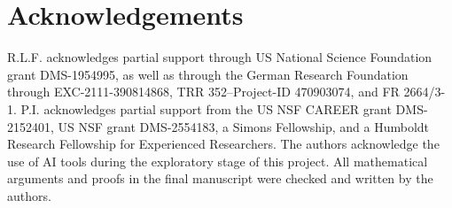 \documentclass[11pt,reqno]{amsart}
\numberwithin{equation}{section}
\begin{document}


\section*{Acknowledgements}
R.L.F. acknowledges partial support through US National Science Foundation grant DMS-1954995, as well as through the German Research Foundation through EXC-2111-390814868, TRR 352--Project-ID 470903074, and FR 2664/3-1.  P.I. acknowledges partial support from the US NSF CAREER grant DMS-2152401, US NSF grant DMS-2554183, a Simons Fellowship, and a Humboldt Research Fellowship for Experienced Researchers. The authors acknowledge the use of AI tools during the exploratory stage of this project.  All mathematical arguments and proofs in the final manuscript were checked and written by the authors.
\end{document}
